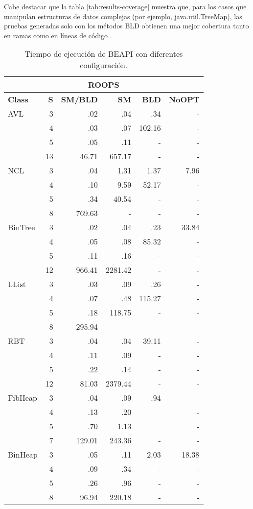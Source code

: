 Cabe destacar que la tabla \ref{tab:results-coverage} muestra que, para los casos que manipulan estructuras de datos complejas (por ejemplo, java.util.TreeMap), las pruebas generadas solo con los métodos BLD obtienen una mejor cobertura tanto en ramas como en líneas de código
.
\begin{table}[!thb]
\scriptsize
\centering
\caption{Tiempo de ejecución de BEAPI con diferentes configuración.}

\begin{tabular}{ l r | r | r | r | r  }
  \toprule
  \multicolumn{6}{c}{\textbf{ROOPS}} \\
  \midrule 
  \textbf{Class} & \textbf{S} & \textbf{SM/BLD} & \textbf{SM}  & \textbf{BLD} & \textbf{NoOPT}  \\
  \midrule
  AVL
  & 3& .02 & .04 & .34 & - \\ 
  & 4& .03 & .07 & 102.16 & - \\ 
  & 5& .05 & .11 & - & - \\ 
  & 13& 46.71 & 657.17 & - & - \\ 
  \midrule
  NCL
  & 3& .04 & 1.31 & 1.37 & 7.96 \\ 
  & 4& .10 & 9.59 & 52.17 & - \\ 
  & 5& .34 & 40.54 & - & - \\ 
  & 8& 769.63 & - & - &  -\\ 
  \midrule
  BinTree
  & 3& .02 & .04 & .23 & 33.84 \\ 
  & 4& .05 & .08 & 85.32 & - \\ 
  & 5& .11 & .16 & - & - \\ 
  & 12& 966.41 & 2281.42 & - & - \\ 
  \midrule
  LList
  & 3& .03 & .09 & .26 & - \\ 
  & 4& .07 & .48 & 115.27 & - \\ 
  & 5& .18 & 118.75 & - & - \\ 
  & 8& 295.94 & - & - & - \\ 
  \midrule
  RBT
  & 3& .04 & .04 & 39.11 & - \\ 
  & 4& .11 & .09 & - & - \\ 
  & 5& .22 & .14 & - & - \\ 
  & 12& 81.03 & 2379.44 & - & - \\ 
  \midrule
  FibHeap
  & 3& .04 & .09 & .94 & - \\ 
  & 4& .13 & .20 &  & - \\ 
  & 5& .70 & 1.13 &  & - \\ 
  & 7& 129.01 & 243.36 & - & - \\ 
  \midrule
  BinHeap
  & 3& .05 & .11 & 2.03 & 18.38 \\ 
  & 4& .09 & .34 & - & - \\ 
  & 5& .26 & .96 & - & - \\  
  & 8& 96.94 & 220.18 & - & - \\ 
  \bottomrule
\end{tabular}
\end{table}

